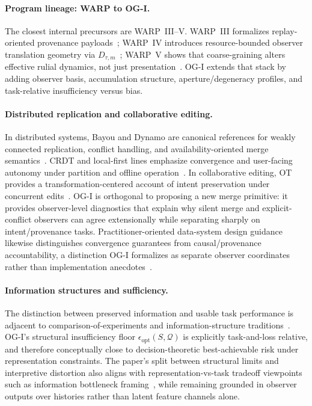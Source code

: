 \documentclass[11pt,twoside]{article}
\theoremstyle{definition}
\begin{document}
\paragraph{Program lineage: WARP to OG-I.}
The closest internal precursors are WARP~III--V. WARP~III formalizes replay-oriented provenance payloads~\cite{ross_paper_iii}; WARP~IV introduces resource-bounded observer translation geometry via \(D_{\tau,m}\)~\cite{ross_paper_iv}; WARP~V shows that coarse-graining alters effective rulial dynamics, not just presentation~\cite{ross_paper_v}. OG-I extends that stack by adding observer basis, accumulation structure, aperture/degeneracy profiles, and task-relative insufficiency versus bias.

\paragraph{Distributed replication and collaborative editing.}
In distributed systems, Bayou and Dynamo are canonical references for weakly connected replication, conflict handling, and availability-oriented merge semantics~\cite{terry1995bayou,decandia2007dynamo}. CRDT and local-first lines emphasize convergence and user-facing autonomy under partition and offline operation~\cite{shapiro2011crdt,kleppmann2019localfirst}. In collaborative editing, OT provides a transformation-centered account of intent preservation under concurrent edits~\cite{ellis1989groupware,sun1998ot}. OG-I is orthogonal to proposing a new merge primitive: it provides observer-level diagnostics that explain why silent merge and explicit-conflict observers can agree extensionally while separating sharply on intent/provenance tasks.
Practitioner-oriented data-system design guidance likewise distinguishes convergence guarantees from causal/provenance accountability, a distinction OG-I formalizes as separate observer coordinates rather than implementation anecdotes~\cite{kleppmann2017ddia}.

\paragraph{Information structures and sufficiency.}
The distinction between preserved information and usable task performance is adjacent to comparison-of-experiments and information-structure traditions~\cite{blackwell1953comparison}. OG-I's structural insufficiency floor \(\epsilon_{\mathrm{opt}}(S,\mathcal{Q})\) is explicitly task-and-loss relative, and therefore conceptually close to decision-theoretic best-achievable risk under representation constraints. The paper's split between structural limits and interpretive distortion also aligns with representation-vs-task tradeoff viewpoints such as information bottleneck framing~\cite{tishby1999informationbottleneck}, while remaining grounded in observer outputs over histories rather than latent feature channels alone.
\end{document}
